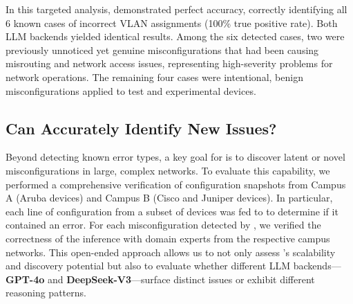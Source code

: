 
In this targeted analysis, \sysname{} demonstrated perfect accuracy, correctly identifying all 6 known cases of incorrect VLAN assignments (100\% true positive rate). Both LLM backends yielded identical results. Among the six detected cases, two were previously unnoticed yet genuine misconfigurations that had been causing misrouting and network access issues, representing high-severity problems for network operations. The remaining four cases were intentional, benign misconfigurations applied to test and experimental devices.



\subsection{Can \sysname{} Accurately Identify New Issues?}

Beyond detecting known error types, a key goal for \sysname{} is to discover latent or novel misconfigurations in large, complex networks. To evaluate this capability, we performed a comprehensive verification of configuration snapshots from Campus A (Aruba devices) and Campus B (Cisco and Juniper devices). 
In particular, each line of configuration from a subset of devices was fed to \sysname{} to determine if it contained an error.
For each misconfiguration detected by \sysname{}, we verified the correctness of the inference with domain experts from the respective campus networks. 
This open-ended approach allows us to not only assess \sysname{}'s scalability and discovery potential but also to evaluate whether different LLM backends---\textbf{GPT-4o} and \textbf{DeepSeek-V3}---surface distinct issues or exhibit different reasoning patterns. 

